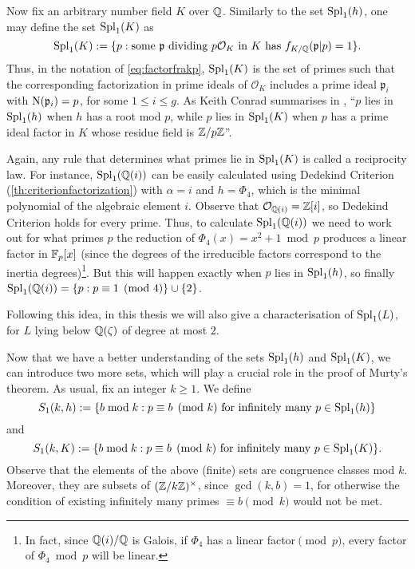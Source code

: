 \documentclass[../main.tex]{subfiles}
\begin{document}
Now fix an arbitrary number field $K$ over $\mathbb{Q}$. Similarly to the set $\operatorname{Spl}_1(h)$, one may define the set $\operatorname{Spl}_1(K)$ as
	\begin{equation*}
		\operatorname{Spl}_1(K):=\{p: \text{some $\mathfrak{p}$ dividing $p\mathcal{O}_K$ in $K$ has $f_{K/\mathbb{Q}}(\mathfrak{p} | p)=1$}\}.
	\end{equation*}
Thus, in the notation of \cref{eq:factorfrakp}, $\operatorname{Spl}_1(K)$ is the set of primes such that the corresponding factorization in prime ideals of $\mathcal{O}_K$ includes a prime ideal $\mathfrak{p}_i$ with $\operatorname{N}(\mathfrak{p}_i)=p$, for some $1\leqslant i \leqslant g$.
As Keith Conrad summarises in \cite{Conrad}, ``$p$ lies in $\operatorname{Spl}_1(h)$ when $h$ has a root mod $p$, while $p$ lies in $\operatorname{Spl}_1(K)$ when $p$ has a prime ideal factor in $K$ whose residue field is $\mathbb{Z}/p\mathbb{Z}$''.

Again, any rule that determines what primes lie in $\operatorname{Spl}_1(K)$ is called a reciprocity law. For instance, $\operatorname{Spl}_1(\mathbb{Q}(i))$ can be easily calculated using Dedekind Criterion (\cref{th:criterionfactorization}) with $\alpha=i$ and $h=\Phi_4$, which is the minimal polynomial of the algebraic element $i$. Observe that $\mathcal{O}_{\mathbb{Q}(i)}=\mathbb{Z}[i]$, so Dedekind Criterion holds for every prime. Thus, to calculate $\operatorname{Spl}_1(\mathbb{Q}(i))$ we need to work out for what primes $p$ the reduction of $\Phi_4(x)=x^2+1 \bmod{p}$ produces a linear factor in $\mathbb{F}_p[x]$ (since the degrees of the irreducible factors correspond to the inertia degrees)\footnote{In fact, since $\mathbb{Q}(i)/\mathbb{Q}$ is Galois, if $\Phi_4$ has a linear factor$\pmod{p}$, every factor of $\Phi_4\bmod{p}$ will be linear.}. But this will happen exactly when $p$ lies in $\operatorname{Spl}_1(h)$, so finally $\operatorname{Spl}_1(\mathbb{Q}(i))=\{p: p\equiv 1\pmod{4}\}\cup\{2\}$.

Following this idea, in this thesis we will also give a characterisation of $\operatorname{Spl}_1(L)$, for $L$ lying below $\mathbb{Q}(\zeta)$ of degree at most $2$.

Now that we have a better understanding of the sets $\operatorname{Spl}_1(h)$ and $\operatorname{Spl}_1(K)$, we can introduce two more sets, which will play a crucial role in the proof of Murty's theorem. As usual, fix an integer $k\geqslant 1$. We define
	\begin{equation*}
		S_1(k,h):=\{b \bmod{k}: p\equiv b \pmod{k} \ \text{for infinitely many $p\in\operatorname{Spl}_1(h)$}\}
	\end{equation*}
and
	\begin{equation*}
	S_1(k,K):=\{b \bmod{k}: p\equiv b \pmod{k} \ \text{for infinitely many $p\in\operatorname{Spl}_1(K)$}\}.
	\end{equation*}
Observe that the elements of the above (finite) sets are congruence classes mod $k$. Moreover, they are subsets of $(\mathbb{Z}/k\mathbb{Z})^\times$, since $\gcd(k, b)=1$, for otherwise the condition of existing infinitely many primes $\equiv b\pmod{k}$ would not be met.
\end{document}
